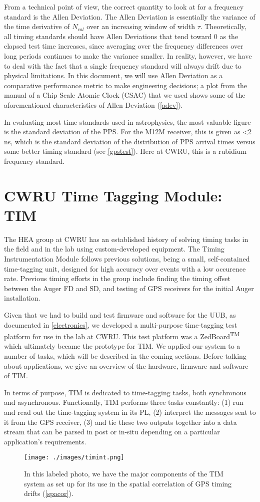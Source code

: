 From a technical point of view, the correct quantity to look at for a frequency standard is the Allen Deviation. The Allen Deviation is essentially the variance of the time derivative of $N_{cal}$ over an increasing window of width $\tau$. Theoretically, all timing standards should have Allen Deviations that tend toward 0 as the elapsed test time increases, since averaging over the frequency differences over long periods continues to make the variance smaller. In reality, however, we have to deal with the fact that a single frequency standard will always drift due to physical limitations. In this document, we will use Allen Deviation as a comparative performance metric to make engineering decisions; a plot from the manual of a Chip Scale Atomic Clock (CSAC) that we used shows some of the aforementioned characteristics of Allen Deviation (\autoref{adev}). 

In evaluating most time standards used in astrophysics, the most valuable figure is the standard deviation of the PPS. For the M12M receiver, this is given as \textless2 ns, which is the standard deviation of the distribution of PPS arrival times versus some better timing standard (see \autoref{gpstest}). Here at CWRU, this is a rubidium frequency standard.


\section{CWRU Time Tagging Module: TIM}
\label{tim}
The HEA group at CWRU has an established history of solving timing tasks in the field and in the lab using custom-developed equipment. The Timing Instrumentation Module follows previous solutions, being a small, self-contained time-tagging unit, designed for high accuracy over events with a low occurence rate. Previous timing efforts in the group include finding the timing offset between the Auger FD and SD, and testing of GPS receivers for the initial Auger installation. 

Given that we had to build and test firmware and software for the UUB, as documented in \autoref{electronics}, we developed a multi-purpose time-tagging test platform for use in the lab at CWRU. This test platform was a ZedBoard\textsuperscript{TM} which ultimately became the prototype for TIM. We applied our system to a number of tasks, which will be described in the coming sections. Before talking about applications, we give an overview of the hardware, firmware and software of TIM.

In terms of purpose, TIM is dedicated to time-tagging tasks, both synchronous and asynchronous. Functionally, TIM performs three tasks constantly: (1) run and read out the time-tagging system in its PL, (2) interpret the messages sent to it from the GPS receiver, (3) and tie these two outputs together into a data stream that can be parsed in post or in-situ depending on a particular application's requirements.
\begin{figure}[H]
\centering
\texttt{[image: ./images/timint.png]}
\caption[TIM Internals Diagram]{In this labeled photo, we have the major components of the TIM system as set up for its use in the spatial correlation of GPS timing drifts (\autoref{spacor}).}
\label{timint}
\end{figure}
